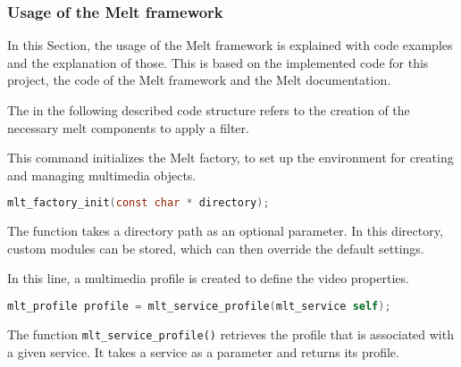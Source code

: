 \documentclass[../MasterThesis.tex]{subfiles}
\begin{document}
\subsubsection*{Usage of the Melt framework}


In this Section, the usage of the Melt framework is explained with code examples and the explanation of those. This is based on the implemented code for this project, the code of the Melt framework and the Melt documentation.~\cite{melt}

The in the following described code structure refers to the creation of the necessary melt components to apply a filter.


\begin{description}[font=\color{RedViolet!80!black}, style=nextline]
	
	\item[Initialise the factory] 
	
	This command initializes the Melt factory, to set up the environment for creating and managing multimedia objects.
	
	\begin{lstlisting}[language=C, numbers=none, columns=fullflexible, belowskip=0pt, aboveskip=9pt]
	mlt_factory_init(const char * directory); \end{lstlisting}

	The function takes a directory path as an optional parameter. In this directory, custom modules can be stored, which can then override the default settings. %
	
	
	\item[Create a profile]
	
	In this line, a multimedia profile is created to define the video properties.
	
	\begin{lstlisting}[language=C, numbers=none, columns=fullflexible, belowskip=0pt, aboveskip=9pt]
	mlt_profile profile = mlt_service_profile(mlt_service self); \end{lstlisting}
	
	The function \texttt{mlt\_service\_profile()} retrieves the profile that is associated with a given service. It takes a service as a parameter and returns its profile.
	
	


	\item[Create a producer] 


\end{description}
\end{document}

